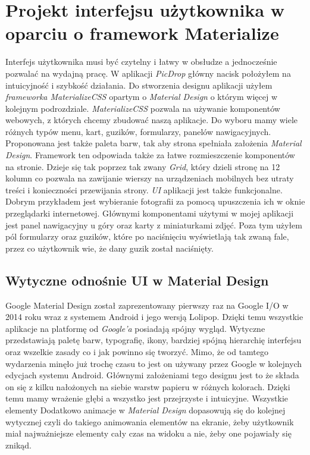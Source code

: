 \documentclass[brudnopis]{xmgr}
\begin{document}
\section{Projekt interfejsu użytkownika w oparciu o framework Materialize}
	Interfejs użytkownika musi być czytelny i łatwy w obsłudze a jednocześnie pozwalać na wydajną pracę. W aplikacji \textit{PicDrop} główny nacisk położyłem na intuicyjność i szybkość działania. Do stworzenia designu aplikacji użyłem \textit{frameworka MaterializeCSS} opartym o \textit{Material Design} o którym więcej w kolejnym podrozdziale. \textit{MaterializeCSS} pozwala na używanie komponentów webowych, z których chcemy zbudować naszą aplikacje. Do wyboru mamy wiele różnych typów menu, kart, guzików, formularzy, panelów nawigacyjnych. Proponowana jest także paleta barw, tak aby strona spełniała założenia \textit{Material Design}. Framework ten odpowiada także za łatwe rozmieszczenie komponentów na stronie. Dzieje się tak poprzez tak zwany \textit{Grid}, który dzieli stronę na 12 kolumn co pozwala na zawijanie wierszy na urządzeniach mobilnych bez utraty treści i konieczności przewijania strony. \textit{UI} aplikacji jest także funkcjonalne. Dobrym przykładem jest wybieranie fotografii za pomocą upuszczenia ich w oknie przeglądarki internetowej. Głównymi komponentami użytymi w mojej aplikacji jest panel nawigacyjny u góry oraz karty z miniaturkami zdjęć. Poza tym użyłem pól formularzy oraz guzików, które po naciśnięciu wyświetlają tak zwaną fale, przez co użytkownik wie, że dany guzik został naciśnięty.
\subsection{Wytyczne odnośnie UI w Material Design}
Google Material Design został zaprezentowany pierwszy raz na Google I/O w 2014 roku wraz z systemem Android i jego wersją Lolipop.  Dzięki temu wszystkie aplikacje na platformę od \textit{Google’a} posiadają spójny wygląd. Wytyczne przedstawiają paletę barw, typografię, ikony, bardziej spójną hierarchię interfejsu oraz wszelkie zasady co i jak powinno się tworzyć. Mimo, że od tamtego wydarzenia minęło już trochę czasu to jest on używany przez Google w kolejnych edycjach systemu Android. Głównymi założeniami tego designu jest to że składa on się z kilku  nałożonych na siebie warstw papieru w różnych kolorach. Dzięki temu mamy wrażenie głębi a wszystko jest przejrzyste i intuicyjne. Wszystkie elementy Dodatkowo animacje w \textit{Material Design} dopasowują się do kolejnej wytycznej czyli do takiego animowania elementów na ekranie, żeby użytkownik miał najważniejsze elementy cały czas na widoku a nie, żeby one pojawiały się znikąd. 
\end{document}
